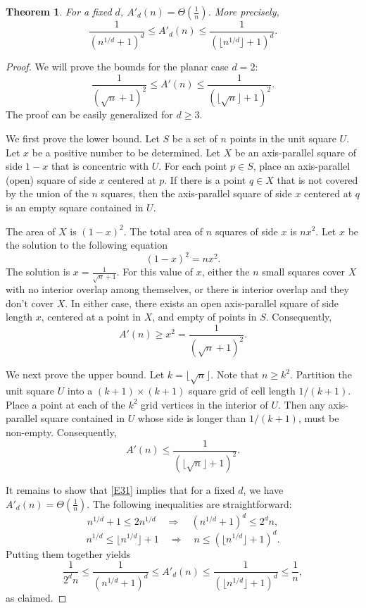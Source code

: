 \documentclass[11pt]{article}
\newtheorem{theorem}{Theorem}
\begin{document}
\begin{theorem} \label{T5}
For a fixed $d$, $A'_d(n) =\Theta\left(\frac{1}{n}\right)$. 
More precisely,
\begin{equation} \label{E31}
\frac{1}{(n^{1/d} + 1)^d} \leq A'_d(n) \leq
\frac{1}{(\lfloor n^{1/d} \rfloor + 1)^d}. 
\end{equation}
\end{theorem}
\begin{proof}
We will prove the bounds for the planar case $d = 2$:
$$ \frac{1}{(\sqrt{n} + 1)^2} \leq A'(n) \leq
\frac{1}{(\lfloor \sqrt{n} \rfloor + 1)^2}. $$
The proof can be easily generalized for $d \geq 3$.

We first prove the lower bound. Let $S$ be a set of $n$ points in the unit
square $U$. Let $x$ be a positive number to be determined. Let $X$ be
an axis-parallel square of side $1 - x$ that is concentric with $U$. For
each point $p \in S$, place an axis-parallel (open) square of side $x$
centered at $p$. If there is a point $q \in X$ that is not covered by the
union of the $n$ squares, then the axis-parallel square of side $x$
centered at $q$ is an empty square contained in $U$.

The area of $X$ is $(1 - x)^2$. The total area of $n$ squares of side
$x$ is $n x^2$. Let $x$ be the solution to the following equation
$$ (1 - x)^2 = n x^2. $$
The solution is $x = \frac{1}{\sqrt{n} + 1} $. For this value of $x$, 
either the $n$ small squares cover $X$ with no interior overlap among
themselves, or there is interior overlap and they don't cover $X$. In
either case, there exists an open axis-parallel square of side length
$x$, centered at a point in $X$, and empty of points in $S$. Consequently,  
$$ A'(n) \geq x^2 = \frac{1}{(\sqrt{n} + 1)^2}. $$


We next prove the upper bound. Let $k = \lfloor \sqrt{n} \rfloor$. Note
that $n \ge k^2$. Partition the unit square $U$ into a $(k+1) \times (k+1)$
square grid of cell length $1/(k+1)$. Place a point at each of the $k^2$
grid vertices in the interior of $U$. Then any axis-parallel square
contained in $U$ whose side is longer than $1/(k+1)$, must be
non-empty. Consequently, 
$$ A'(n) \leq \frac{1}{(\lfloor \sqrt{n}\rfloor  + 1)^2}. $$


It remains to show that \eqref{E31} implies that for a fixed $d$, 
we have $A'_d(n) =\Theta\left(\frac{1}{n}\right)$.
The following inequalities are straightforward:
$$ n^{1/d} + 1 \leq 2 n^{1/d} \quad\Rightarrow\quad 
(n^{1/d} + 1)^d \leq 2^d n, $$
$$ n^{1/d} \leq \lfloor n^{1/d} \rfloor +1 \quad\Rightarrow\quad
n \leq (\lfloor n^{1/d} \rfloor + 1)^d. $$
Putting them together yields
$$ \frac{1}{2^d n} \leq \frac{1}{(n^{1/d} + 1)^d} \leq A'_d(n) \leq
\frac{1}{(\lfloor n^{1/d} \rfloor + 1)^d} \leq 
\frac{1}{n}, $$
as claimed.
\end{proof}
\end{document}
